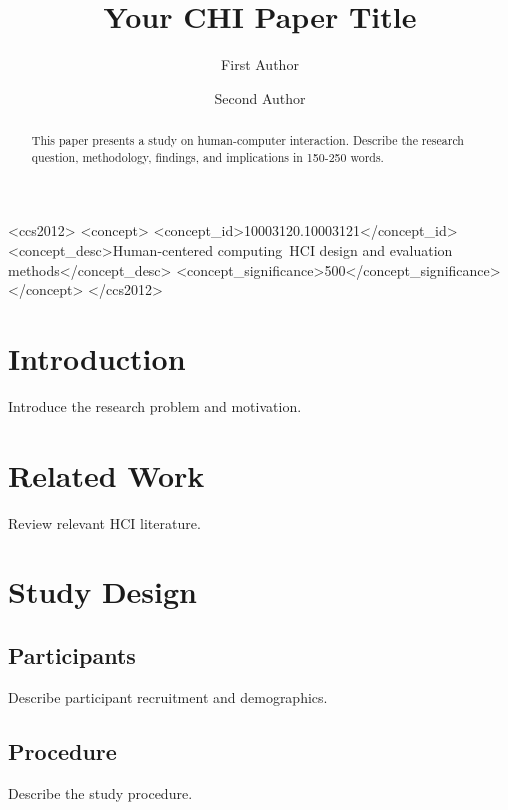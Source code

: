 \documentclass[sigchi,review]{acmart}
\begin{document}
\title{Your CHI Paper Title}

\author{First Author}

\author{Second Author}

\begin{abstract}
This paper presents a study on human-computer interaction. Describe the research question, methodology, findings, and implications in 150-250 words.
\end{abstract}

\begin{CCSXML}
<ccs2012>
<concept>
<concept_id>10003120.10003121</concept_id>
<concept_desc>Human-centered computing~HCI design and evaluation methods</concept_desc>
<concept_significance>500</concept_significance>
</concept>
</ccs2012>
\end{CCSXML}



\maketitle

\section{Introduction}
Introduce the research problem and motivation.

\section{Related Work}
Review relevant HCI literature.

\section{Study Design}
\subsection{Participants}
Describe participant recruitment and demographics.

\subsection{Procedure}
Describe the study procedure.
\end{document}

